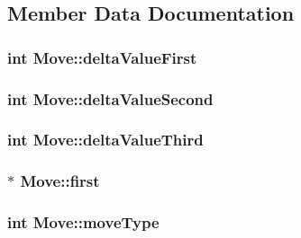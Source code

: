 \subsection{Member Data Documentation}
\hypertarget{class_move_ada1a03cd63710abd68c0e4505fe21f7e}{
\subsubsection[{delta\-Value\-First}]{\setlength{\rightskip}{0pt plus 5cm}int Move\-::delta\-Value\-First}}\label{class_move_ada1a03cd63710abd68c0e4505fe21f7e}
\hypertarget{class_move_af9a41af4cf88de2eb07d4601bbaf5011}{
\subsubsection[{delta\-Value\-Second}]{\setlength{\rightskip}{0pt plus 5cm}int Move\-::delta\-Value\-Second}}\label{class_move_af9a41af4cf88de2eb07d4601bbaf5011}
\hypertarget{class_move_ad1d160b2033500b68a66337c7e13e657}{
\subsubsection[{delta\-Value\-Third}]{\setlength{\rightskip}{0pt plus 5cm}int Move\-::delta\-Value\-Third}}\label{class_move_ad1d160b2033500b68a66337c7e13e657}
\hypertarget{class_move_ac4f4c8f895b197447e16b70c240b7746}{
\subsubsection[{first}]{$\ast$ Move\-::first}}\label{class_move_ac4f4c8f895b197447e16b70c240b7746}
\hypertarget{class_move_a5ffe8371cd87d9714122dacf913ae238}{
\subsubsection[{move\-Type}]{\setlength{\rightskip}{0pt plus 5cm}int Move\-::move\-Type}}\label{class_move_a5ffe8371cd87d9714122dacf913ae238}
